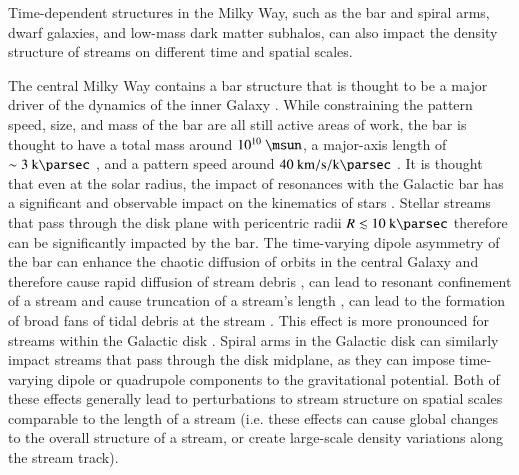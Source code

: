 \documentclass[final,5p,times,twocolumn,authoryear]{elsarticle}
\begin{document}
Time-dependent structures in the Milky Way, such as the bar and spiral arms, dwarf
galaxies, and low-mass dark matter subhalos, can also impact the density structure of
streams on different time and spatial scales.

The central Milky Way contains a bar structure that is thought to be a major driver of
the dynamics of the inner Galaxy \citep[e.g.,][]{blitz:1991}.
While constraining the pattern speed, size, and mass of the bar are all still active
areas of work, the bar is thought to have a total mass around $10^{10}~\unit{\msun}$, a
major-axis length of $\sim 3~\kpc$ \citep[e.g.,][]{wegg:2015}, and a pattern speed
around $40~\unit{\kms\per\kpc}$ \citep[e.g.,][]{portail:2017, sanders:2019}.
It is thought that even at the solar radius, the impact of resonances with the Galactic
bar has a significant and observable impact on the kinematics of stars
\citep[e.g.,][]{dehnen:1999, kawata:2021}.
Stellar streams that pass through the disk plane with pericentric radii $R \lesssim
10~\kpc$ therefore can be significantly impacted by the bar.
The time-varying dipole asymmetry of the bar can enhance the chaotic diffusion of orbits
in the central Galaxy and therefore cause rapid diffusion of stream debris
\citep{price-whelan:2016b}, can lead to resonant confinement of a stream and cause
truncation of a stream's length \citep{hattori:2016}, can lead to the formation of
broad fans of tidal debris at the  stream \citep{pearson:2017}.
This effect is more pronounced for streams within the Galactic disk
\citep{thomas:2023}.
Spiral arms in the Galactic disk can similarly impact streams that pass through the disk
midplane, as they can impose time-varying dipole or quadrupole components to the gravitational
potential.
Both of these effects generally lead to perturbations to stream structure on spatial
scales comparable to the length of a stream (i.e. these effects can cause global changes
to the overall structure of a stream, or create large-scale density variations along the
stream track).
\end{document}
